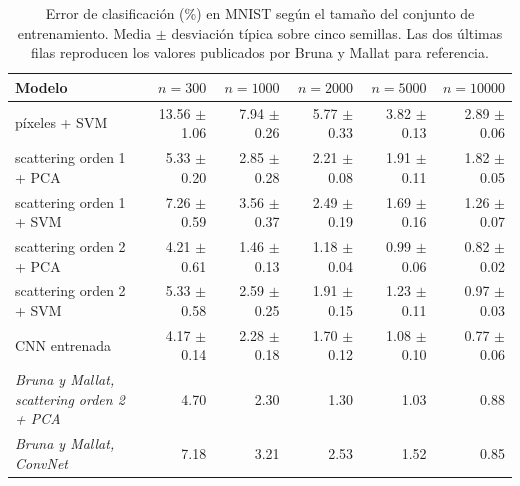 \begin{table}[t]
  \centering
  \small
  \caption{Error de clasificación (\%) en MNIST según el tamaño del
  conjunto de entrenamiento. Media $\pm$ desviación típica sobre cinco
  semillas. Las dos últimas filas reproducen los valores publicados por
  Bruna y Mallat para referencia.}
  \label{tab:resultados}
  \begin{tabular}{lrrrrr}
    \toprule
    Modelo & $n=300$ & $n=1000$ & $n=2000$ & $n=5000$ & $n=10000$ \\
    \midrule
    píxeles + SVM & 13.56 $\pm$ 1.06 & 7.94 $\pm$ 0.26 & 5.77 $\pm$ 0.33 & 3.82 $\pm$ 0.13 & 2.89 $\pm$ 0.06 \\
    scattering orden 1 + PCA & 5.33 $\pm$ 0.20 & 2.85 $\pm$ 0.28 & 2.21 $\pm$ 0.08 & 1.91 $\pm$ 0.11 & 1.82 $\pm$ 0.05 \\
    scattering orden 1 + SVM & 7.26 $\pm$ 0.59 & 3.56 $\pm$ 0.37 & 2.49 $\pm$ 0.19 & 1.69 $\pm$ 0.16 & 1.26 $\pm$ 0.07 \\
    scattering orden 2 + PCA & 4.21 $\pm$ 0.61 & 1.46 $\pm$ 0.13 & 1.18 $\pm$ 0.04 & 0.99 $\pm$ 0.06 & 0.82 $\pm$ 0.02 \\
    scattering orden 2 + SVM & 5.33 $\pm$ 0.58 & 2.59 $\pm$ 0.25 & 1.91 $\pm$ 0.15 & 1.23 $\pm$ 0.11 & 0.97 $\pm$ 0.03 \\
    CNN entrenada & 4.17 $\pm$ 0.14 & 2.28 $\pm$ 0.18 & 1.70 $\pm$ 0.12 & 1.08 $\pm$ 0.10 & 0.77 $\pm$ 0.06 \\
    \midrule
    \emph{Bruna y Mallat, scattering orden 2 + PCA} & 4.70 & 2.30 & 1.30 & 1.03 & 0.88 \\
    \emph{Bruna y Mallat, ConvNet} & 7.18 & 3.21 & 2.53 & 1.52 & 0.85 \\
    \bottomrule
  \end{tabular}
\end{table}
